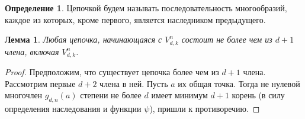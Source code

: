 \documentclass[16pt]{article}
\theoremstyle{plain1}
\newtheorem{lemma}[theorem1]{Лемма}
\theoremstyle{plain2}
\theoremstyle{plain}
\theoremstyle{plain3}
\theoremstyle{definition}
\newtheorem{definition}[theorem2]{Определение}
\theoremstyle{remark}
\begin{document}
\begin{definition}
Цепочкой будем называть последовательность многообразий, каждое  из которых, кроме первого, является наследником предыдущего.
\end{definition}

\begin{lemma}\label{lemma:o_konechnosti_cepochek}
Любая цепочка, начинающаяся с ${V}_{d,k}^{n}$ состоит не более чем из  $d+1$ члена, включая ${V}_{d,k}^{n}$.
\end{lemma}

\begin{proof}
Предположим, что  существует цепочка более чем из $d+1$ члена. Рассмотрим первые $d+2$  члена в ней. Пусть $a$ их общая точка. Тогда не нулевой многочлен $g_{d,n}(a)$ степени не более $d$ имеет минимум $d+1$  корень (в силу определения наследования и функции $\psi$), пришли к противоречию.
\end{proof}
\end{document}
